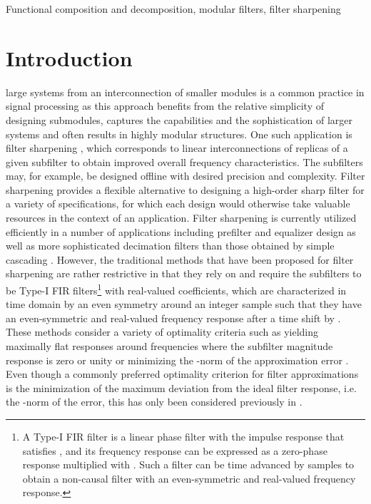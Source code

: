\documentclass[journal] {IEEEtran}
\begin{document}
\begin{IEEEkeywords}
Functional composition and decomposition, modular filters, filter sharpening
\end{IEEEkeywords}



\IEEEpeerreviewmaketitle



\section{Introduction}


 large systems from an interconnection of smaller modules is a common practice in signal processing as this approach benefits from the relative simplicity of designing submodules, captures the capabilities and the sophistication of larger systems and often results in highly modular structures. One such application is filter sharpening \cite{Kaiser1977}, which corresponds to linear interconnections of replicas of a given subfilter to obtain improved overall frequency characteristics. The subfilters may, for example, be designed offline with desired precision and complexity. Filter sharpening provides a flexible alternative to designing a high-order sharp filter for a variety of specifications, for which each design would otherwise take valuable resources in the context of an application. Filter sharpening is currently utilized efficiently in a number of applications including prefilter and equalizer design \cite{Adams1984,Cabezas1989,Jiang1990} as well as more sophisticated decimation filters than those obtained by simple cascading \cite{Kwentus1997}. However, the traditional methods that have been proposed for filter sharpening \cite{Kaiser1977, Nakamura, Saramaki, Hartnett1995, Chen, Samadi2000} are rather restrictive in that they rely on and require the subfilters to be Type-I FIR filters\footnote{A Type-I FIR filter is a linear phase filter with the impulse response  that satisfies , and its frequency response can be expressed as a zero-phase response multiplied with  \cite{Oppenheim}. Such a filter can be time advanced by  samples to obtain a non-causal filter with an even-symmetric and real-valued frequency response.} with real-valued coefficients, which are characterized in time domain by an even symmetry around an integer sample  such that they have an even-symmetric and real-valued frequency response after a time shift by . These methods consider a variety of optimality criteria such as yielding maximally flat responses around frequencies where the subfilter magnitude response is zero or unity \cite{Kaiser1977, Hartnett1995, Samadi2000} or minimizing the -norm of the approximation error \cite{Nakamura}. Even though a commonly preferred optimality criterion for filter approximations is the minimization of the maximum deviation from the ideal filter response, i.e. the -norm of the error, this has only been considered previously in \cite{Saramaki}.
\end{document}
